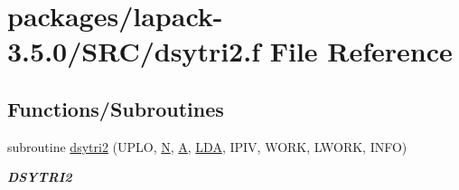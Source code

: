 \hypertarget{dsytri2_8f}{}\section{packages/lapack-\/3.5.0/\+S\+R\+C/dsytri2.f File Reference}
\label{dsytri2_8f}
\subsection*{Functions/\+Subroutines}
\begin{DoxyCompactItemize}
\item 
subroutine \hyperlink{group__doubleSYcomputational_ga6a3be7737b1a49bb70bf6ac514b3ca34}{dsytri2} (U\+P\+L\+O, \hyperlink{polmisc_8c_a0240ac851181b84ac374872dc5434ee4}{N}, \hyperlink{classA}{A}, \hyperlink{example__user_8c_ae946da542ce0db94dced19b2ecefd1aa}{L\+D\+A}, I\+P\+I\+V, W\+O\+R\+K, L\+W\+O\+R\+K, I\+N\+F\+O)
\begin{DoxyCompactList}\small\item\em {\bfseries D\+S\+Y\+T\+R\+I2} \end{DoxyCompactList}\end{DoxyCompactItemize}
